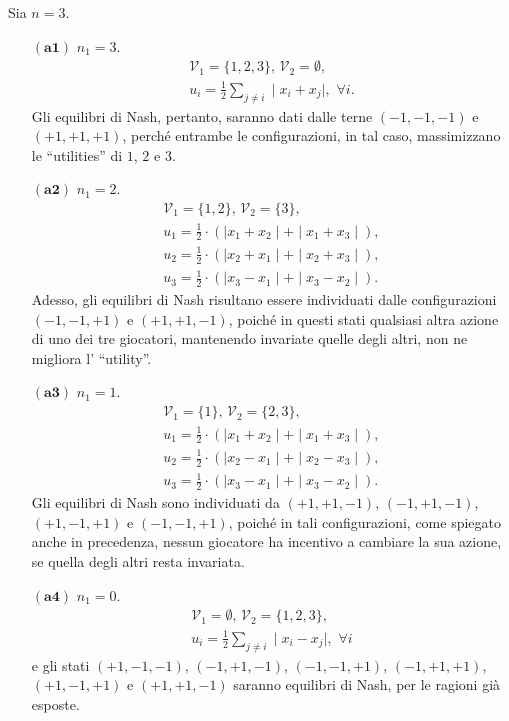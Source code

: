 \documentclass[11pt,largemargins]{homework}
\begin{document}
\begin{alphaparts}
\questionpart
Sia $n=3$.


  
  \begin{itemize}
  \item[$\left(\textbf{a1}\right)$]  $n_{1}=3$.
  \begin{align*}
  \mathcal{V}_{1}=\{1,2,3\}, \, \mathcal{V}_{2}=\emptyset, \\
   u_{i}=\frac{1}{2}\sum_{j\neq i}\mid x_{i}+x_{j}\mid, \,\, \forall i.
  \end{align*}
  Gli equilibri di Nash, pertanto, saranno dati dalle terne $\left(-1,-1,-1\right)$ e $\left(+1,+1,+1\right)$, perché entrambe le configurazioni, in tal caso, massimizzano le ``utilities'' di $1$, $2$ e $3$.
  
  \item[$\left(\textbf{a2}\right)$] $n_{1}=2$.
  \begin{align*}
  \mathcal{V}_{1}=\{1,2\}, \, \mathcal{V}_{2}=\{3\},\\
  u_{1}=\frac{1}{2}\cdot \left(\mid x_{1}+x_{2}\mid + \mid x_{1}+x_{3}\mid\right), \\ u_{2}=\frac{1}{2}\cdot \left(\mid x_{2}+x_{1}\mid + \mid x_{2}+x_{3}\mid\right), \\ u_{3}=\frac{1}{2}\cdot \left(\mid x_{3}-x_{1}\mid + \mid x_{3}-x_{2}\mid\right).
  \end{align*}
  Adesso, gli equilibri di Nash risultano essere individuati dalle configurazioni $\left(-1,-1,+1\right)$ e $\left(+1,+1,-1\right)$, poiché in questi stati qualsiasi altra azione di uno dei tre giocatori, mantenendo invariate quelle degli altri, non ne migliora l' ``utility''.
  \item[$\left(\textbf{a3}\right)$]  $n_{1}=1$.
  \begin{align*}
  \mathcal{V}_{1}=\{1\},\, \mathcal{V}_{2}=\{2,3\},\\
  u_{1}=\frac{1}{2}\cdot \left(\mid x_{1}+x_{2}\mid + \mid x_{1}+x_{3}\mid\right), \\
  u_{2}=\frac{1}{2}\cdot \left(\mid x_{2}-x_{1}\mid + \mid x_{2}-x_{3}\mid\right), \\
  u_{3}=\frac{1}{2}\cdot \left(\mid x_{3}-x_{1}\mid + \mid x_{3}-x_{2}\mid\right).
  \end{align*}
  Gli equilibri di Nash sono individuati da $\left(+1,+1,-1\right)$, $\left(-1,+1,-1\right)$, $\left(+1,-1,+1\right)$ e $\left(-1,-1,+1\right)$, poiché in tali configurazioni, come spiegato anche in precedenza, nessun giocatore ha incentivo a cambiare la sua azione, se quella degli altri resta invariata.
  \item[$\left(\textbf{a4}\right)$] $n_{1}=0$.
  \begin{align*}
  \mathcal{V}_{1}=\emptyset, \, \mathcal{V}_{2}=\{1,2,3\},\\
  u_{i}=\frac{1}{2}\sum_{j\neq i}\mid x_{i}-x_{j}\mid, \,\, \forall i
  \end{align*}
  e gli stati $\left(+1,-1,-1\right)$, $\left(-1,+1,-1\right)$, $\left(-1,-1,+1\right)$, $\left(-1,+1,+1\right)$, $\left(+1,-1,+1\right)$ e $\left(+1,+1,-1\right)$ saranno equilibri di Nash, per le ragioni già esposte.
  \end{itemize}
  

\end{alphaparts}
\end{document}
